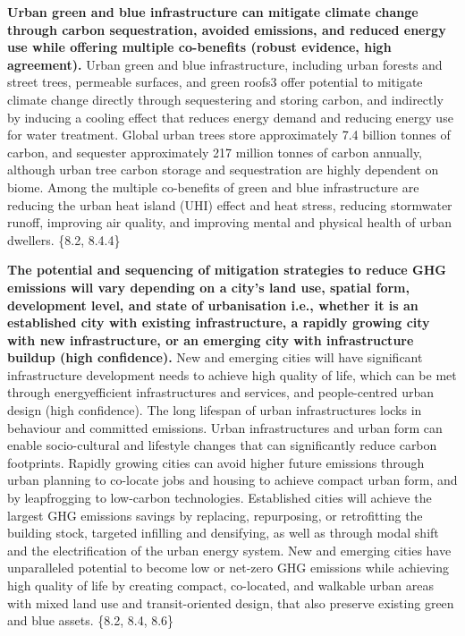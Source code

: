 \documentclass[
  letterpaper,
  DIV=11,
  numbers=noendperiod]{scrreprt}
\begin{document}
\textbf{Urban green and blue infrastructure can mitigate climate change
through carbon sequestration, avoided emissions, and reduced energy use
while offering multiple co-benefits (robust evidence, high agreement).}
Urban green and blue infrastructure, including urban forests and street
trees, permeable surfaces, and green roofs3 offer potential to mitigate
climate change directly through sequestering and storing carbon, and
indirectly by inducing a cooling effect that reduces energy demand and
reducing energy use for water treatment. Global urban trees store
approximately 7.4 billion tonnes of carbon, and sequester approximately
217 million tonnes of carbon annually, although urban tree carbon
storage and sequestration are highly dependent on biome. Among the
multiple co-benefits of green and blue infrastructure are reducing the
urban heat island (UHI) effect and heat stress, reducing stormwater
runoff, improving air quality, and improving mental and physical health
of urban dwellers. \{8.2, 8.4.4\}

\textbf{The potential and sequencing of mitigation strategies to reduce
GHG emissions will vary depending on a city's land use, spatial form,
development level, and state of urbanisation i.e., whether it is an
established city with existing infrastructure, a rapidly growing city
with new infrastructure, or an emerging city with infrastructure buildup
(high confidence).} New and emerging cities will have significant
infrastructure development needs to achieve high quality of life, which
can be met through energyefficient infrastructures and services, and
people-centred urban design (high confidence). The long lifespan of
urban infrastructures locks in behaviour and committed emissions. Urban
infrastructures and urban form can enable socio-cultural and lifestyle
changes that can significantly reduce carbon footprints. Rapidly growing
cities can avoid higher future emissions through urban planning to
co-locate jobs and housing to achieve compact urban form, and by
leapfrogging to low-carbon technologies. Established cities will achieve
the largest GHG emissions savings by replacing, repurposing, or
retrofitting the building stock, targeted infilling and densifying, as
well as through modal shift and the electrification of the urban energy
system. New and emerging cities have unparalleled potential to become
low or net-zero GHG emissions while achieving high quality of life by
creating compact, co-located, and walkable urban areas with mixed land
use and transit-oriented design, that also preserve existing green and
blue assets. \{8.2, 8.4, 8.6\}
\end{document}
